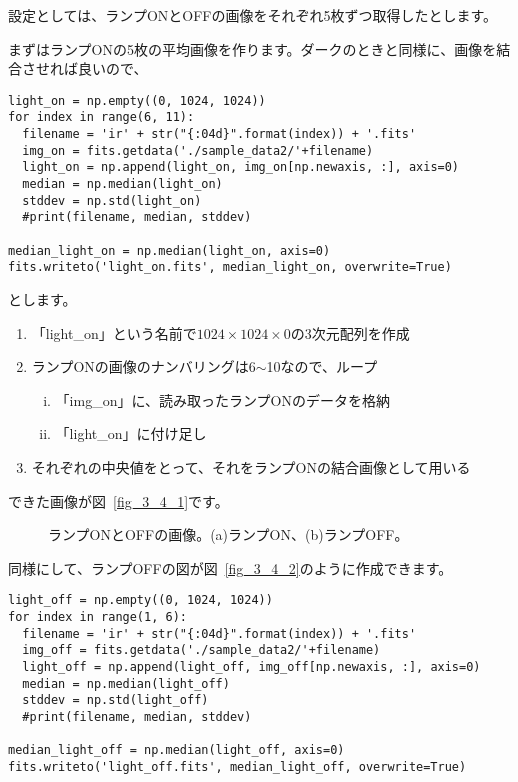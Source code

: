 設定としては、ランプONとOFFの画像をそれぞれ5枚ずつ取得したとします。

まずはランプONの5枚の平均画像を作ります。ダークのときと同様に、画像を結合させれば良いので、
\begin{lstlisting}[caption=ランプONのフラット画像,label=code_3_4_1]
light_on = np.empty((0, 1024, 1024))
for index in range(6, 11):
  filename = 'ir' + str("{:04d}".format(index)) + '.fits'
  img_on = fits.getdata('./sample_data2/'+filename)
  light_on = np.append(light_on, img_on[np.newaxis, :], axis=0)
  median = np.median(light_on)
  stddev = np.std(light_on)
  #print(filename, median, stddev)

median_light_on = np.median(light_on, axis=0)
fits.writeto('light_on.fits', median_light_on, overwrite=True)
\end{lstlisting}
とします。

\begin{enumerate}[(1)]
  \item 「light\_on」という名前で$1024\times1024\times0$の3次元配列を作成
  \item ランプONの画像のナンバリングは6$\sim$10なので、ループ
  \begin{enumerate}[(i)]
    \item 「img\_on」に、読み取ったランプONのデータを格納
    \item 「light\_on」に付け足し
  \end{enumerate}
  \item それぞれの中央値をとって、それをランプONの結合画像として用いる
\end{enumerate}

できた画像が図~\ref{fig_3_4_1}です。
\begin{figure}
  \centering
  \caption[ランプONとOFFの画像]{ランプONとOFFの画像。(a)ランプON、(b)ランプOFF。}
  \label{fig_3_4}
\end{figure}

同様にして、ランプOFFの図が図~\ref{fig_3_4_2}のように作成できます。
\begin{lstlisting}[caption=ランプOFFのフラット画像,label=code_3_4_2]
light_off = np.empty((0, 1024, 1024))
for index in range(1, 6):
  filename = 'ir' + str("{:04d}".format(index)) + '.fits'
  img_off = fits.getdata('./sample_data2/'+filename)
  light_off = np.append(light_off, img_off[np.newaxis, :], axis=0)
  median = np.median(light_off)
  stddev = np.std(light_off)
  #print(filename, median, stddev)

median_light_off = np.median(light_off, axis=0)
fits.writeto('light_off.fits', median_light_off, overwrite=True)
\end{lstlisting}

